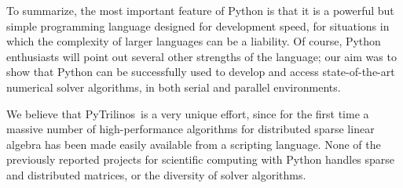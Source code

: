 \documentclass[10pt,relax]{SANDreport}
\newcommand{\PyTrilinos}{{PyTrilinos}}
\begin{document}
\smallskip

To summarize, the most important feature of Python is that it is a
powerful but simple programming language designed for development
speed, for situations in which the complexity of larger languages can
be a liability. Of course, Python enthusiasts will point out several
other strengths of the language; our aim was to show that Python can
be successfully used to develop and access state-of-the-art numerical
solver algorithms, in both serial and parallel environments.

We believe that \PyTrilinos\ is a very unique effort, since for the
first time a massive number of high-performance algorithms for
distributed sparse linear algebra has been made easily available from
a scripting language.  None of the previously reported projects for
scientific computing with Python handles sparse and distributed
matrices, or the diversity of solver algorithms.



\end{document}

